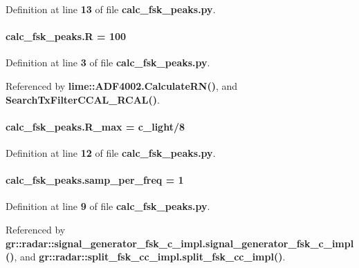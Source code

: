 Definition at line {\bf 13} of file {\bf calc\+\_\+fsk\+\_\+peaks.\+py}.

\paragraph[{R}]{ calc\+\_\+fsk\+\_\+peaks.\+R = 100}\label{namespacecalc__fsk__peaks_a5e3ffd41bef30815cec6376f6dc513c1}


Definition at line {\bf 3} of file {\bf calc\+\_\+fsk\+\_\+peaks.\+py}.



Referenced by {\bf lime\+::\+A\+D\+F4002.\+Calculate\+R\+N()}, and {\bf Search\+Tx\+Filter\+C\+C\+A\+L\+\_\+\+R\+C\+A\+L()}.

\paragraph[{R\+\_\+max}]{ calc\+\_\+fsk\+\_\+peaks.\+R\+\_\+max = {\bf c\+\_\+light}/8}\label{namespacecalc__fsk__peaks_a3063d1997228df9d1e18b8f228c928ec}


Definition at line {\bf 12} of file {\bf calc\+\_\+fsk\+\_\+peaks.\+py}.

\paragraph[{samp\+\_\+per\+\_\+freq}]{ calc\+\_\+fsk\+\_\+peaks.\+samp\+\_\+per\+\_\+freq = 1}\label{namespacecalc__fsk__peaks_a5024f0e1bf8c71f2e37b6992698e30d7}


Definition at line {\bf 9} of file {\bf calc\+\_\+fsk\+\_\+peaks.\+py}.



Referenced by {\bf gr\+::radar\+::signal\+\_\+generator\+\_\+fsk\+\_\+c\+\_\+impl.\+signal\+\_\+generator\+\_\+fsk\+\_\+c\+\_\+impl()}, and {\bf gr\+::radar\+::split\+\_\+fsk\+\_\+cc\+\_\+impl.\+split\+\_\+fsk\+\_\+cc\+\_\+impl()}.

